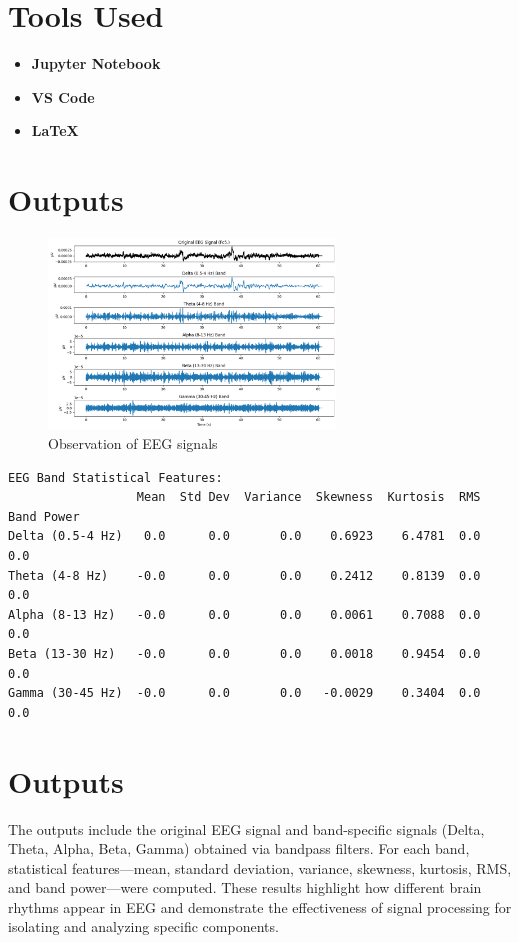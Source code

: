 \documentclass[a4paper,11pt]{article}
\begin{document}
\section*{Tools Used}
\begin{itemize}
    \item \textbf{Jupyter Notebook}
    \item \textbf{VS Code}
    \item \textbf{\LaTeX}
\end{itemize}

\section*{Outputs}
\begin{figure}[H]
    \centering
    \includegraphics[width=0.68\textwidth]{output.png}
    \caption{Observation of EEG signals}
    \label{fig:raw_eeg}
\end{figure}

\vspace{-1em}

\begin{verbatim}
EEG Band Statistical Features:
                  Mean  Std Dev  Variance  Skewness  Kurtosis  RMS  Band Power
Delta (0.5-4 Hz)   0.0      0.0       0.0    0.6923    6.4781  0.0         0.0
Theta (4-8 Hz)    -0.0      0.0       0.0    0.2412    0.8139  0.0         0.0
Alpha (8-13 Hz)   -0.0      0.0       0.0    0.0061    0.7088  0.0         0.0
Beta (13-30 Hz)   -0.0      0.0       0.0    0.0018    0.9454  0.0         0.0
Gamma (30-45 Hz)  -0.0      0.0       0.0   -0.0029    0.3404  0.0         0.0
\end{verbatim}


\section*{Outputs}
The outputs include the original EEG signal and band-specific signals (Delta, Theta, Alpha, Beta, Gamma) obtained via bandpass filters. For each band, statistical features—mean, standard deviation, variance, skewness, kurtosis, RMS, and band power—were computed. These results highlight how different brain rhythms appear in EEG and demonstrate the effectiveness of signal processing for isolating and analyzing specific components.
\end{document}
